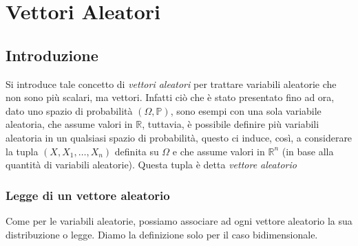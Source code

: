 % 
\chapter{Vettori Aleatori}

\section{Introduzione}

Si introduce tale concetto di \textit{vettori aleatori} per trattare variabili aleatorie che non sono più scalari, ma vettori. Infatti ciò che è stato presentato fino ad ora, dato uno spazio di probabilità $(\Omega, \mathbb{P})$, sono esempi con una sola variabile aleatoria, che assume valori in $\mathbb{R}$, tuttavia, è possibile definire più variabili aleatoria in un qualsiasi spazio di probabilità, questo ci induce, così, a considerare la tupla $(X,X_1, \dots, X_n)$ definita su $\Omega$ e che assume valori in $\mathbb{R}^n$ (in base alla quantità di variabili aleatorie). Questa tupla è detta \textit{vettore aleatorio}


\subsection{Legge di un vettore aleatorio}
Come per le variabili aleatorie, possiamo associare ad ogni vettore aleatorio la sua distribuzione o legge. Diamo la definizione solo per il caso bidimensionale.


